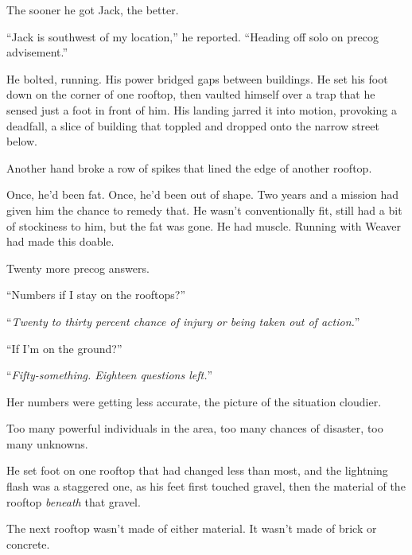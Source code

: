 The sooner he got Jack, the better.



``Jack is southwest of my location,'' he reported.  ``Heading off solo on precog advisement.''



He bolted, running.  His power bridged gaps between buildings.  He set his foot down on the corner of one rooftop, then vaulted himself over a trap that he sensed just a foot in front of him.  His landing jarred it into motion, provoking a deadfall, a slice of building that toppled and dropped onto the narrow street below.



Another hand broke a row of spikes that lined the edge of another rooftop.



Once, he'd been fat.  Once, he'd been out of shape.  Two years and a mission had given him the chance to remedy that.  He wasn't conventionally fit, still had a bit of stockiness to him, but the fat was gone.  He had muscle.  Running with Weaver had made this doable.



Twenty more precog answers.



``Numbers if I stay on the rooftops?''



``\emph{Twenty to thirty percent chance of injury or being taken out of action.}''



``If I'm on the ground?''



``\emph{Fifty-something.  Eighteen questions left.}''



Her numbers were getting less accurate, the picture of the situation cloudier.



Too many powerful individuals in the area, too many chances of disaster, too many unknowns.



He set foot on one rooftop that had changed less than most, and the lightning flash was a staggered one, as his feet first touched gravel, then the material of the rooftop \emph{beneath }that gravel.



The next rooftop wasn't made of either material.  It wasn't made of brick or concrete.



